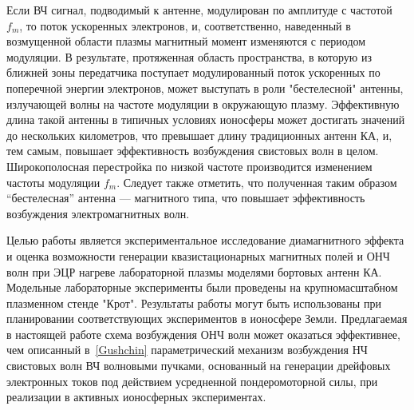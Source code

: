 \documentclass[autoref,10pt]{disser}
\begin{document}
Если ВЧ сигнал, подводимый к антенне, модулирован по амплитуде с частотой $f_{m}$, то поток ускоренных электронов, и, соответственно, наведенный в возмущенной области плазмы магнитный момент изменяются с периодом модуляции. В результате, протяженная область пространства, в которую из ближней зоны передатчика поступает модулированный поток ускоренных по поперечной энергии электронов, может выступать в роли "бестелесной" антенны, излучающей волны на частоте модуляции в окружающую плазму. Эффективную длина такой антенны в типичных условиях ионосферы может достигать значений до нескольких километров, что превышает длину традиционных антенн КА, и, тем самым, повышает эффективность возбуждения свистовых волн в целом. Широкополосная перестройка по низкой частоте производится изменением частоты модуляции $f_{m}$. Следует также отметить, что полученная таким образом ``бестелесная'' антенна --- магнитного типа, что повышает эффективность возбуждения электромагнитных волн.

Целью работы является экспериментальное исследование диамагнитного эффекта и оценка возможности генерации квазистационарных магнитных полей и ОНЧ волн при ЭЦР нагреве лабораторной плазмы моделями бортовых антенн КА. Модельные лабораторные эксперименты были проведены на крупномасштабном плазменном стенде "Крот". Результаты работы могут быть использованы при планировании соответствующих экспериментов в ионосфере Земли.
Предлагаемая в настоящей работе схема возбуждения ОНЧ волн может оказаться эффективнее, чем описанный  в~\ref{Gushchin} параметрический механизм возбуждения НЧ свистовых волн ВЧ волновыми пучками, основанный на генерации дрейфовых электронных токов под действием усредненной пондеромоторной силы, при реализации в активных ионосферных экспериментах. 

%
%
%
%
%
%
%
%
\end{document}
